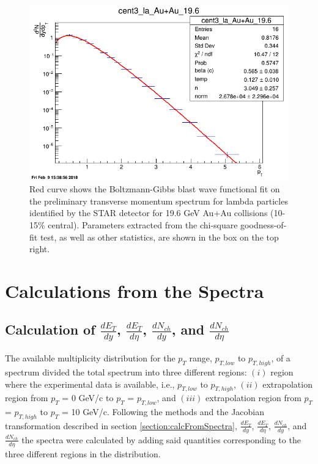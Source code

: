 	\begin{figure}[h]
	  \centering
	  \includegraphics[width=6.5in]{figures/cent3_la_Au+Au_196.png}
	  \caption{Red curve shows the Boltzmann-Gibbs blast wave functional fit on the preliminary transverse momentum spectrum for lambda particles identified by the STAR detector for 19.6 GeV Au+Au collisions (10-15\% central). Parameters extracted from the chi-square goodness-of-fit test, as well as other statistics, are shown in the box on the top right.}\label{fig:fit}
	\end{figure}

\section{Calculations from the Spectra}

\subsection{Calculation of $\frac{dE_{T}}{dy}$, $\frac{dE_{T}}{d\eta}$, $\frac{dN_{ch}}{dy}$, and $\frac{dN_{ch}}{d\eta}$}
The available multiplicity distribution for the $p_{T}$ range, $p_{T,low}$ to $p_{T,high}$, of a spectrum divided the total spectrum into three different regions: $(i)$ region where the experimental data is available, i.e., $p_{T,low}$ to $p_{T,high}$, $(ii)$ extrapolation region from $p_{T}$ = 0 GeV/c to $p_{T}$ = $p_{T,low}$, and $(iii)$ extrapolation region from $p_{T}$ = $p_{T,high}$ to $p_{T}$ = 10 GeV/c. Following the methods and the Jacobian transformation described in section \ref{section:calcFromSpectra}, $\frac{dE_{T}}{dy}$, $\frac{dE_{T}}{d\eta}$, $\frac{dN_{ch}}{dy}$, and $\frac{dN_{ch}}{d\eta}$ the spectra were calculated by adding said quantities corresponding to the three different regions in the distribution.

